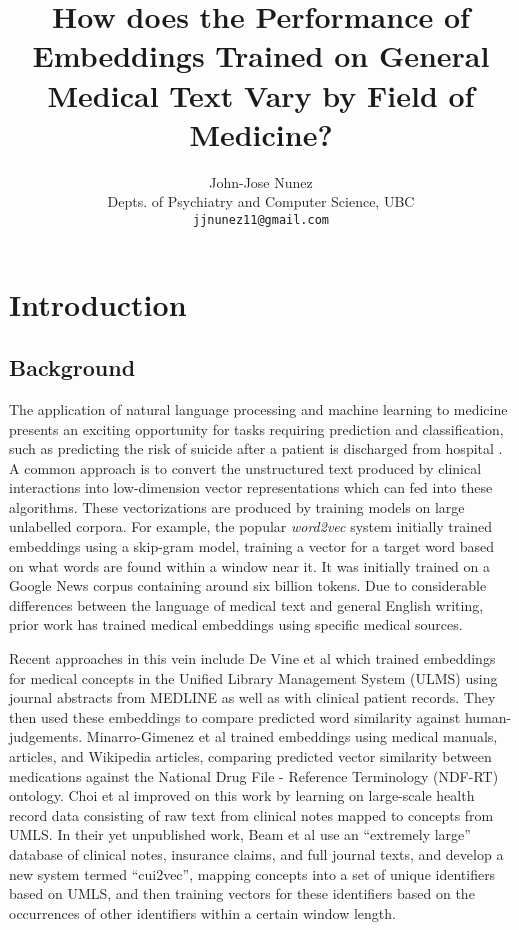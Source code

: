 \documentclass[10pt]{article}
\title{How does the Performance of Embeddings Trained on General Medical Text Vary by Field of Medicine?}
\author{John-Jose Nunez\\
  Depts. of Psychiatry and Computer Science, UBC\\
  {\tt jjnunez11@gmail.com} 
}
\date{}
\begin{document}
\maketitle

\section{Introduction}

\subsection{Background}



The application of natural language processing and machine learning to medicine presents an exciting opportunity for tasks requiring prediction and classification, such as predicting the risk of suicide after a patient is discharged from hospital \cite{mccoyImprovingPredictionSuicide2016}. A common approach is to convert the unstructured text produced by clinical interactions into low-dimension vector representations which can fed into these algorithms. These vectorizations are produced by training models on large unlabelled corpora. For example, the popular \emph{word2vec} system \cite{mikolovEfficientEstimationWord2013} initially trained embeddings using a skip-gram model, training a vector for a target word based on what words are found within a window near it. It was initially trained on a Google News corpus containing around six billion tokens. Due to considerable differences between the language of medical text and general English writing, prior work has trained medical embeddings using specific medical sources. 

Recent approaches in this vein include De Vine et al  which trained embeddings for medical concepts in the Unified Library Management System (ULMS) \cite{bodenreiderUnifiedMedicalLanguage2004} using journal abstracts from MEDLINE as well as with clinical patient records. They then used these embeddings to compare predicted word similarity against human-judgements. Minarro-Gimenez et al  trained embeddings using medical manuals, articles, and Wikipedia articles, comparing predicted vector similarity between medications against the National Drug File - Reference Terminology (NDF-RT) ontology. Choi et al \cite{choiLearningLowDimensionalRepresentations2016} improved on this work by learning on large-scale health record data consisting of raw text from clinical notes mapped to concepts from UMLS. In their yet unpublished work, Beam et al \cite{beamClinicalConceptEmbeddings2018} use an ``extremely large'' database of clinical notes, insurance claims, and full journal texts, and develop a new system termed ``cui2vec'', mapping concepts into a set of unique identifiers based on UMLS, and then training vectors for these identifiers based on the occurrences of other identifiers within a certain window length. 
\end{document}
